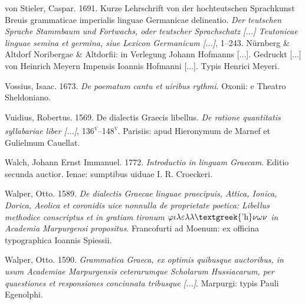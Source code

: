 \begin{styleStandard}
von Stieler, Caspar. 1691. Kurze Lehrschrift von der hochteutschen Sprachkunst {\textbar} Breuis grammaticae imperialis linguae Germanicae delineatio. \textit{Der teutschen Sprache Stammbaum und Fortwachs, oder teutscher Sprachschatz [...] {\textbar} Teutonicae linguae semina et germina, siue Lexicon Germanicum [...]}, 1–243. Nürnberg \& Altdorf {\textbar} Noribergae \& Altdorfii: in Verlegung Johann Hofmanns [...]. Gedruckt [...] von Heinrich Meyern {\textbar} Impensis Ioannis Hofmanni [...]. Typis Henrici Meyeri.
\end{styleStandard}

\begin{styleStandard}
Vossius, Isaac. 1673. \textit{De poematum cantu et uiribus rythmi}. Oxonii: e Theatro Sheldoniano.
\end{styleStandard}

\begin{styleStandard}
Vuidius, Robertus. 1569. De dialectis Graecis libellus. \textit{De ratione quantitatis syllabariae liber [...]}, 136\textsc{\textsuperscript{v}}–148\textsc{\textsuperscript{v}}. Parisiis: apud Hieronymum de Marnef et Gulielmum Cauellat.
\end{styleStandard}

\begin{styleStandard}
Walch, Johann Ernst Immanuel. 1772. \textit{Introductio in linguam Graecam}. Editio secunda auctior. Ienae: sumptibus uiduae I. R. Croeckeri.
\end{styleStandard}

\begin{styleStandard}
Walper, Otto. 1589. \textit{De dialectis Graecae linguae praecipuis, Attica, Ionica, Dorica, Aeolica et coronidis uice nonnulla de proprietate poetica: Libellus methodice conscriptus et in gratiam tironum $\varphi \iota \lambda \varepsilon \lambda \lambda \text{\textgreek{'h}}\nu \omega \nu $ in Academia Marpurgensi propositus}. Francofurti ad Moenum: ex officina typographica Ioannis Spiessii.
\end{styleStandard}

\begin{styleStandard}
Walper, Otto. 1590. \textit{Grammatica Graeca, ex optimis quibusque auctoribus, in usum Academiae Marpurgensis ceterarumque Scholarum Hussiacarum, per quaestiones et responsiones concinnata tribusque [...]}. Marpurgi: typis Pauli Egenolphi.
\end{styleStandard}

